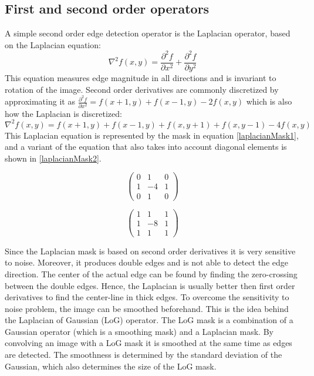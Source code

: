 \subsection{First and second order operators}
A simple second order edge detection operator is the Laplacian operator, based on the Laplacian equation:
\begin{equation}
\nabla^2f(x,y) = \frac{\partial^2 f}{\partial x^2} + \frac{\partial^2 f}{\partial y^2}
\end{equation}
This equation measures edge magnitude in all directions and is invariant to rotation of the image. Second order derivatives are commonly discretized by approximating it as \(\frac{\partial^2 f}{\partial x^2} = f(x+1,y) + f(x-1,y) - 2f(x,y)\) which is also how the Laplacian is discretized: 
\begin{equation}
\nabla^2f(x,y) = f(x+1,y) + f(x-1,y) + f(x,y+1) + f(x,y-1) - 4f(x,y)
\end{equation}
This Laplacian equation is represented by the mask in equation \ref{laplacianMask1}, and a variant of the equation that also takes into account diagonal elements is shown in \ref{laplacianMask2}.
\newline
\newline 
\begin{minipage}{.45\textwidth}
\begin{equation}
\begin{pmatrix}
0 & 1 & 0 \\
1 & -4 & 1 \\
0 & 1 & 0
\end{pmatrix}
\label{laplacianMask1}
\end{equation}
\end{minipage}
\begin{minipage}{.45\textwidth}
\begin{equation}
\begin{pmatrix}
1 & 1 & 1 \\
1 & -8 & 1 \\
1 & 1 & 1
\end{pmatrix}
\label{laplacianMask2}
\end{equation}
\end{minipage}
\newline
\newline

Since the Laplacian mask is based on second order derivatives it is very sensitive to noise. Moreover, it produces double edges and is not able to detect the edge direction. The center of the actual edge can be found by finding the zero-crossing between the double edges. Hence, the Laplacian is usually better then first order derivatives to find the center-line in thick edges. To overcome the sensitivity to noise problem, the image can be smoothed beforehand. This is the idea behind the Laplacian of Gaussian (LoG) operator. The LoG mask is a combination of a Gaussian operator (which is a smoothing mask) and a Laplacian mask. By convolving an image with a LoG mask it is smoothed at the same time as edges are detected. The smoothness is determined by the standard deviation of the Gaussian, which also determines the size of the LoG mask.

